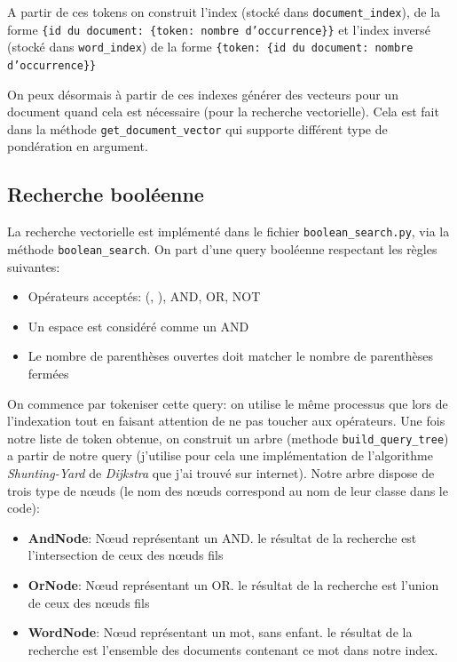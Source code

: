 \documentclass{article}
\begin{document}
A partir de ces tokens on construit l'index (stocké dans \texttt{document\_index}), de la forme \texttt{\{id du document: \{token: nombre d’occurrence\}\}} et l'index inversé (stocké dans \texttt{word\_index}) de la forme \texttt{\{token: \{id du document: nombre d’occurrence\}\}}

On peux désormais à partir de ces indexes générer des vecteurs pour un document quand cela est nécessaire (pour la recherche vectorielle). Cela est fait dans la méthode \texttt{get\_document\_vector} qui supporte différent type de pondération en argument.


\subsection{Recherche booléenne}
La recherche vectorielle est implémenté dans le fichier \texttt{boolean\_search.py}, via la méthode \texttt{boolean\_search}. On part d'une query booléenne respectant les règles suivantes:

\begin{itemize}
    \item Opérateurs acceptés: (,  ),  AND,  OR,  NOT
    \item Un espace est considéré comme un AND
    \item Le nombre de parenthèses ouvertes doit matcher le nombre de parenthèses fermées
\end{itemize}

On commence par tokeniser cette query: on utilise le même processus que lors de l'indexation tout en faisant attention de ne pas toucher aux opérateurs. Une fois notre liste de token obtenue, on construit un arbre (methode \texttt{build\_query\_tree}) a partir de notre query (j'utilise pour cela une implémentation de l'algorithme \textit{Shunting-Yard} de \textit{Dijkstra} que j'ai trouvé sur internet). Notre arbre dispose de trois type de nœuds (le nom des nœuds correspond au nom de leur classe dans le code):

 \begin{itemize}
    \item \textbf{AndNode}: Nœud représentant un AND. le résultat de la recherche est l'intersection de ceux des nœuds fils
    \item \textbf{OrNode}: Nœud représentant un OR. le résultat de la recherche est l'union de ceux des nœuds fils
    \item \textbf{WordNode}: Nœud représentant un mot, sans enfant. le résultat de la recherche est l'ensemble des documents contenant ce mot dans notre index.
\end{itemize}
\end{document}
